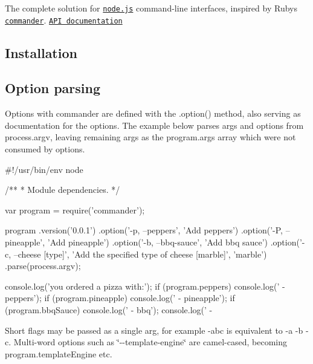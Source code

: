 \href{http://travis-ci.org/tj/commander.js}{\tt } \href{https://www.npmjs.org/package/commander}{\tt } \href{https://www.npmjs.org/package/commander}{\tt } \href{https://gitter.im/tj/commander.js?utm_source=badge&utm_medium=badge&utm_campaign=pr-badge&utm_content=badge}{\tt }

The complete solution for \href{http://nodejs.org}{\tt node.\+js} command-\/line interfaces, inspired by Ruby\textquotesingle{}s \href{https://github.com/tj/commander}{\tt commander}. \href{http://tj.github.com/commander.js/}{\tt A\+PI documentation}

\subsection*{Installation}



\subsection*{Option parsing}

Options with commander are defined with the {\ttfamily .option()} method, also serving as documentation for the options. The example below parses args and options from {\ttfamily process.\+argv}, leaving remaining args as the {\ttfamily program.\+args} array which were not consumed by options.


\begin{DoxyCode}
#!/usr/bin/env node

/**
 * Module dependencies.
 */

var program = require('commander');

program
  .version('0.0.1')
  .option('-p, --peppers', 'Add peppers')
  .option('-P, --pineapple', 'Add pineapple')
  .option('-b, --bbq-sauce', 'Add bbq sauce')
  .option('-c, --cheese [type]', 'Add the specified type of cheese [marble]', 'marble')
  .parse(process.argv);

console.log('you ordered a pizza with:');
if (program.peppers) console.log('  - peppers');
if (program.pineapple) console.log('  - pineapple');
if (program.bbqSauce) console.log('  - bbq');
console.log('  - %
\end{DoxyCode}


Short flags may be passed as a single arg, for example {\ttfamily -\/abc} is equivalent to {\ttfamily -\/a -\/b -\/c}. Multi-\/word options such as \char`\"{}-\/-\/template-\/engine\char`\"{} are camel-\/cased, becoming {\ttfamily program.\+template\+Engine} etc.

